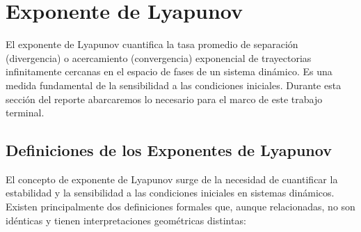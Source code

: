 \section{Exponente de Lyapunov}\label{sec:lyapunnov_exponent}

El exponente de Lyapunov cuantifica la tasa promedio de separación (divergencia) o acercamiento (convergencia) exponencial de trayectorias infinitamente cercanas en el espacio de fases de un sistema dinámico. Es una medida fundamental de la sensibilidad a las condiciones iniciales. Durante esta sección del reporte abarcaremos lo necesario para el marco de este trabajo terminal.

\subsection{Definiciones de los Exponentes de Lyapunov}

El concepto de exponente de Lyapunov surge de la necesidad de cuantificar la estabilidad y la sensibilidad a las condiciones iniciales en sistemas dinámicos. Existen principalmente dos definiciones formales que, aunque relacionadas, no son idénticas y tienen interpretaciones geométricas distintas:

